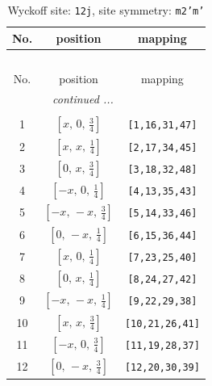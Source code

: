 \documentclass[fleqn,8pt]{jsarticle}
\begin{document}
\begin{longtable}{ccc}
\caption{Wyckoff site: {\tt 12j}, site symmetry: {\tt m2'm'}}
 \\
 \hline \hline
No. & position & mapping \\ \hline \endfirsthead

\multicolumn{2}{l}{\tablename\ \thetable{}} \\
 \hline \hline
No. & position & mapping \\ \hline \endhead

 \hline \hline
\multicolumn{2}{r}{\footnotesize\it continued ...} \\ \endfoot

 \hline \hline
\multicolumn{2}{r}{} \\ \endlastfoot

1 & $\left[ x,\, 0,\, \frac{3}{4} \right]$ & {\tt [1,16,31,47]} \\ \hline
2 & $\left[ x,\, x,\, \frac{1}{4} \right]$ & {\tt [2,17,34,45]} \\ \hline
3 & $\left[ 0,\, x,\, \frac{3}{4} \right]$ & {\tt [3,18,32,48]} \\ \hline
4 & $\left[ - x,\, 0,\, \frac{1}{4} \right]$ & {\tt [4,13,35,43]} \\ \hline
5 & $\left[ - x,\, - x,\, \frac{3}{4} \right]$ & {\tt [5,14,33,46]} \\ \hline
6 & $\left[ 0,\, - x,\, \frac{1}{4} \right]$ & {\tt [6,15,36,44]} \\ \hline
7 & $\left[ x,\, 0,\, \frac{1}{4} \right]$ & {\tt [7,23,25,40]} \\ \hline
8 & $\left[ 0,\, x,\, \frac{1}{4} \right]$ & {\tt [8,24,27,42]} \\ \hline
9 & $\left[ - x,\, - x,\, \frac{1}{4} \right]$ & {\tt [9,22,29,38]} \\ \hline
10 & $\left[ x,\, x,\, \frac{3}{4} \right]$ & {\tt [10,21,26,41]} \\ \hline
11 & $\left[ - x,\, 0,\, \frac{3}{4} \right]$ & {\tt [11,19,28,37]} \\ \hline
12 & $\left[ 0,\, - x,\, \frac{3}{4} \right]$ & {\tt [12,20,30,39]} \\
\end{longtable}
\renewcommand{\arraystretch}{1.2}
\end{document}
